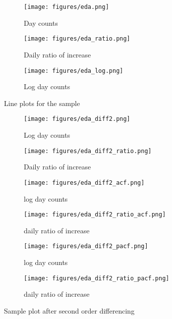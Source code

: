 \documentclass[a4paper]{article}
\begin{document}
\begin{figure}[htpb]
\centering
\begin{subfigure}{.5\textwidth}
  \centering
  \texttt{[image: figures/eda.png]}
  \caption{Day counts}
  \label{eda:eda}
\end{subfigure}%
\begin{subfigure}{.5\textwidth}
  \centering
  \texttt{[image: figures/eda\_ratio.png]}
  \caption{Daily ratio of increase}
  \label{eda:ratio}
\end{subfigure}
\begin{subfigure}{.5\textwidth}
	\centering
	\texttt{[image: figures/eda\_log.png]}
	\caption{Log day counts }
	\label{eda:log}
\end{subfigure}
\caption{Line plots for the sample}
\label{eda}
\end{figure}


\begin{figure}[htpb]
\centering

\begin{subfigure}{.5\textwidth}
	\centering
	\texttt{[image: figures/eda\_diff2.png]}
	\caption{Log day counts}
	\label{diff2:diff2}
\end{subfigure}%
\begin{subfigure}{.5\textwidth}
	\centering
	\texttt{[image: figures/eda\_diff2\_ratio.png]}
	\caption{Daily ratio of increase}
	\label{diff2:ratio}
\end{subfigure}

\begin{subfigure}{.5\textwidth}
	\centering
	\texttt{[image: figures/eda\_diff2\_acf.png]}
	\caption{log day counts}
	\label{diff2:acf}
\end{subfigure}%
\begin{subfigure}{.5\textwidth}
	\centering
	\texttt{[image: figures/eda\_diff2\_ratio\_acf.png]}
	\caption{daily ratio of increase}
	\label{diff2:acf_ratio}
\end{subfigure}

\begin{subfigure}{.5\textwidth}
	\centering
	\texttt{[image: figures/eda\_diff2\_pacf.png]}
	\caption{log day counts}
	\label{diff2:pacf}
\end{subfigure}%
\begin{subfigure}{.5\textwidth}
	\centering
	\texttt{[image: figures/eda\_diff2\_ratio\_pacf.png]}
	\caption{daily ratio of increase}
	\label{diff2:pacf_ratio}
\end{subfigure}

\caption{Sample plot after second order differencing}
\label{diff2}
\end{figure}
\end{document}
